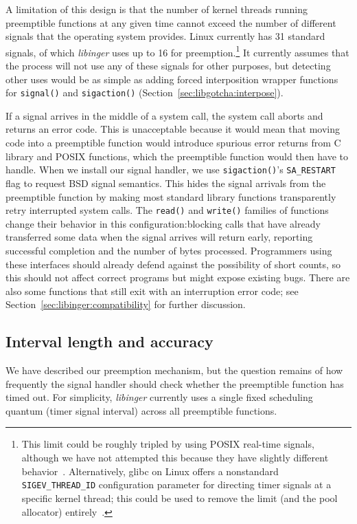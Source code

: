 A limitation of this design is that the number of kernel threads running preemptible
functions at any given time cannot exceed the number of different signals that the
operating system provides.  Linux currently has 31 standard signals, of which
\textit{libinger} uses up to 16 for preemption.\footnote{This limit could be roughly
tripled by using POSIX real-time signals, although we have not attempted this because
they have slightly different behavior~\cite{signal-manpage}.  Alternatively, glibc on
Linux offers a nonstandard \texttt{SIGEV\_THREAD\_ID} configuration parameter for
directing timer signals at a specific kernel thread; this could be used to remove the
limit (and the pool allocator) entirely~\cite{timercreate-manpage}.}  It currently
assumes that the process will not use any of these signals for other purposes, but
detecting other uses would be as simple as adding forced interposition wrapper
functions for \texttt{signal()} and \texttt{sigaction()}
(Section~\ref{sec:libgotcha:interpose}).

If a signal arrives in the middle of a system call, the system call aborts and
returns an error code.  This is unacceptable because it would mean that moving code
into a preemptible function would introduce spurious error returns from C library and
POSIX functions, which the preemptible function would then have to handle.  When we
install our signal handler, we use \texttt{sigaction()}'s \texttt{SA\_RESTART} flag
to request BSD signal semantics.  This hides the signal arrivals from the preemptible
function by making most standard library functions transparently retry interrupted
system calls.  The \texttt{read()} and \texttt{write()} families of functions change
their behavior in this configuration:\@ blocking calls that have already transferred
some data when the signal arrives will return early, reporting successful completion
and the number of bytes processed.  Programmers using these interfaces should already
defend against the possibility of short counts, so this should not affect correct
programs but might expose existing bugs.  There are also some functions that still
exit with an interruption error code; see Section~\ref{sec:libinger:compatibility}
for further discussion.


\subsection{Interval length and accuracy}
\label{sec:libinger:quantum}

We have described our preemption mechanism, but the question remains of how
frequently the signal handler should check whether the preemptible function has timed
out.  For simplicity, \textit{libinger} currently uses a single fixed scheduling
quantum (timer signal interval) across all preemptible functions.

